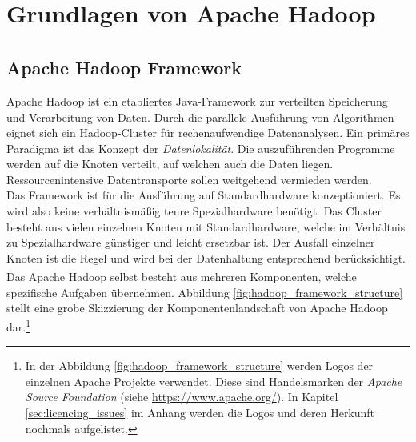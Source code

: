 \chapter{Grundlagen von Apache Hadoop\textsuperscript{\textregistered}}
\label{ch:theory_hadoop}

\section{Apache Hadoop\textsuperscript{\textregistered} Framework}
\label{sec:theory_hadoop}
\noindent
Apache Hadoop ist ein etabliertes Java-Framework zur verteilten Speicherung und Verarbeitung von Daten. Durch die parallele Ausführung von Algorithmen eignet sich ein Hadoop-Cluster für rechenaufwendige Datenanalysen. Ein primäres Paradigma ist das Konzept der \textit{Datenlokalität}. Die auszuführenden Programme werden auf die Knoten verteilt, auf welchen auch die Daten liegen. Ressourcenintensive Datentransporte sollen weitgehend vermieden werden.\cite[S. 20 ff.]{big_data_praxis}\\ 
Das Framework ist für die Ausführung auf Standardhardware konzeptioniert. Es wird also keine verhältnismäßig teure Spezialhardware benötigt. Das Cluster besteht aus vielen einzelnen Knoten mit Standardhardware, welche im Verhältnis zu Spezialhardware günstiger und leicht ersetzbar ist. Der Ausfall einzelner Knoten ist die Regel und wird bei der Datenhaltung entsprechend berücksichtigt. \\

\noindent
Das Apache Hadoop\textsuperscript{\textregistered} selbst besteht aus mehreren Komponenten, welche spezifische Aufgaben übernehmen. Abbildung \ref{fig:hadoop_framework_structure} stellt eine grobe Skizzierung der Komponentenlandschaft von Apache Hadoop dar.\footnote{In der Abbildung \ref{fig:hadoop_framework_structure} werden Logos der einzelnen Apache Projekte verwendet. Diese sind Handelsmarken der \textit{Apache Source Foundation} (siehe \url{https://www.apache.org/}). In Kapitel \ref{sec:licencing_issues} im Anhang werden die Logos und deren Herkunft nochmals aufgelistet.}\\

